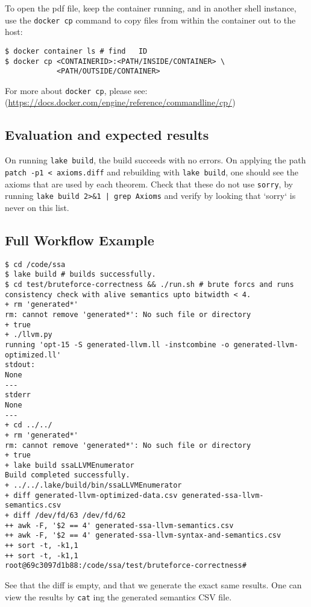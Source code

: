\documentclass{sigplanconf}
\begin{document}
To open the pdf file, keep the container running, and in another
shell instance, use the \texttt{docker cp}
command to copy files from within the container out to the host:

\begin{verbatim}
$ docker container ls # find   ID
$ docker cp <CONTAINERID>:<PATH/INSIDE/CONTAINER> \
            <PATH/OUTSIDE/CONTAINER>
\end{verbatim}
For more about \texttt{docker cp}, please see:
(\url{https://docs.docker.com/engine/reference/commandline/cp/})


\subsection{Evaluation and expected results}

On running \texttt{lake build}, the build succeeds with no errors.
On applying the path \texttt{patch -p1 < axioms.diff} and rebuilding with \texttt{lake build},
one should see the axioms that are used by each theorem. Check that these do not use \texttt{sorry},
by running \texttt{lake build 2>\&1 | grep Axioms} and verify by looking that `sorry` is never on this list.


\subsection{Full Workflow Example}

\begin{verbatim}
$ cd /code/ssa
$ lake build # builds successfully.
$ cd test/bruteforce-correctness && ./run.sh # brute forcs and runs consistency check with alive semantics upto bitwidth < 4.
+ rm 'generated*'
rm: cannot remove 'generated*': No such file or directory
+ true
+ ./llvm.py
running 'opt-15 -S generated-llvm.ll -instcombine -o generated-llvm-optimized.ll'
stdout:
None
---
stderr
None
---
+ cd ../../
+ rm 'generated*'
rm: cannot remove 'generated*': No such file or directory
+ true
+ lake build ssaLLVMEnumerator
Build completed successfully.
+ ../../.lake/build/bin/ssaLLVMEnumerator
+ diff generated-llvm-optimized-data.csv generated-ssa-llvm-semantics.csv
+ diff /dev/fd/63 /dev/fd/62
++ awk -F, '$2 == 4' generated-ssa-llvm-semantics.csv
++ awk -F, '$2 == 4' generated-ssa-llvm-syntax-and-semantics.csv
++ sort -t, -k1,1
++ sort -t, -k1,1
root@69c3097d1b88:/code/ssa/test/bruteforce-correctness#
\end{verbatim}

See that the diff is empty, and that we generate the exact same results.
One can view the results by \texttt{cat} ing the generated semantics CSV file.

\end{document}
